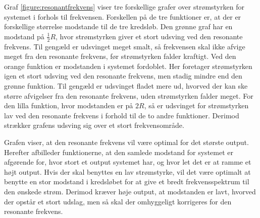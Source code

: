 Graf \ref{figure:resonantfrekvens} viser tre forskellige grafer over strømstyrken for systemet i forhols til frekvensen. Forskellen på de tre funktioner er, at der er forskellige størrelse modstande til de tre kredsløb. Den grønne graf har en modstand på $\frac{1}{2} R$, hvor strømstyrken giver et stort udsving ved den resonante frekvens. Til gengæld er udsvinget meget smalt, så frekvensen skal ikke afvige meget fra den resonante frekvens, før strømstyrken falder kraftigt. Ved den orange funktion er modstanden i systemet fordoblet. Her foretager strømstyrken igen et stort udsving ved den resonante frekvens, men stadig mindre end den grønne funktion. Til gengæld er udsvinget fladet mere ud, hvorved der kan ske større afvigelser fra den resonante frekvens, uden strømstyrken falder meget. For den lilla funktion, hvor modstanden er på $2 R$, så er udsvinget for strømstyrken lav ved den resonante frekvens i forhold til de to andre funktioner. Derimod strækker grafens udsving sig over et stort frekvensområde.

Grafen viser, at den resonante frekvens vil være optimal for det største output. Herefter afbilleder funktionerne, at den samlede modstand for systemet er afgørende for, hvor stort et output systemet har, og hvor let det er at ramme et højt output. Hvis der skal benyttes en lav strømstyrke, vil det være optimalt at benytte en stor modstand i kredsløbet for at give et bredt frekvensspektrum til den ønskede strøm. Derimod kræver høje output, at modstanden er lavt, hvorved der opstår et stort udslag, men så skal der omhyggeligt korrigeres for den resonante frekvens. \cite{fysikbog}